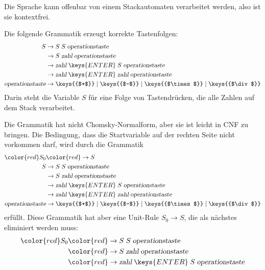 \begin{loesung}
\begin{teilaufgaben}
\item Die Sprache kann offenbar von einem Stackautomaten verarbeitet werden,
also ist sie kontextfrei.
\item Die folgende Grammatik erzeugt korrekte Tastenfolgen:
\begin{align*}
S&\rightarrow S \; S \; \textsl{operationstaste}
\\
 &\rightarrow S \; \textsl{zahl} \; \textsl{operationstaste}
\\
 &\rightarrow \textsl{zahl}\;\keys{ENTER}\; S\;\textsl{operationstaste}
\\
 &\rightarrow \textsl{zahl}\;\keys{ENTER}\; \textsl{zahl}\;\textsl{operationstaste}
\\
\textsl{operationstaste}&\rightarrow
\keys{{$+$}}
\mid 
\keys{{$-$}}
\mid 
\keys{{$\times$}}
\mid 
\keys{{$\div$}}
\\
\end{align*}
Darin steht die Variable $S$ für eine Folge von Tastendrücken, die
alle Zahlen auf dem Stack verarbeitet.
\item
Die Grammatik hat nicht Chomsky-Normalform, aber sie ist leicht in
CNF zu bringen. Die Bedingung, dass die Startvariable auf der rechten
Seite nicht vorkommen darf, wird durch die Grammatik
\begin{align*}
\color{red}S_0&\color{red}\rightarrow S
\\
S&\rightarrow S \; S \; \textsl{operationstaste}
\\
 &\rightarrow S \; \textsl{zahl} \; \textsl{operationstaste}
\\
 &\rightarrow \textsl{zahl}\;\keys{ENTER}\; S\;\textsl{operationstaste}
\\
 &\rightarrow \textsl{zahl}\;\keys{ENTER}\; \textsl{zahl}\;\textsl{operationstaste}
\\
\textsl{operationstaste}&\rightarrow
\keys{{$+$}}
\mid 
\keys{{$-$}}
\mid 
\keys{{$\times$}}
\mid 
\keys{{$\div$}}
\end{align*}
erfüllt. Diese Grammatik hat aber eine Unit-Rule $S_0\to S$, die als nächstes
eliminiert werden muss:
\begin{align*}
\color{red}S_0&\color{red}\rightarrow S \; S \; \textsl{operationstaste}
\\
 &\color{red}\rightarrow S \; \textsl{zahl} \; \textsl{operationstaste}
\\
 &\color{red}\rightarrow \textsl{zahl}\;\keys{ENTER}\; S\;\textsl{operationstaste}

\end{align*}
\end{teilaufgaben}
\end{loesung}
